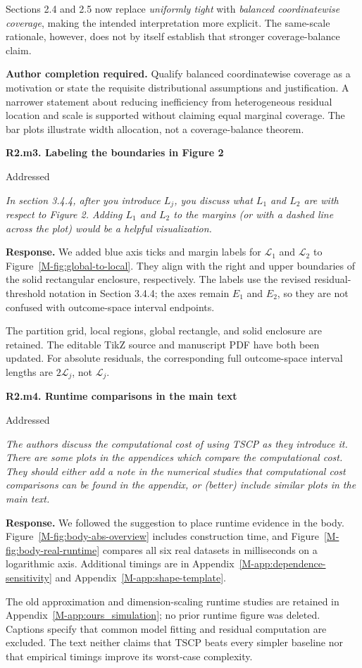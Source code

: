 \documentclass[11pt]{article}
\newcommand{\msapp}[1]{Appendix~\ref*{M-#1}}
\newcommand{\msfig}[1]{Figure~\ref*{M-#1}}
\newcommand{\action}[1]{\par{\small\color{ActionRed}\textbf{Author completion required.} #1\par}}
\newcommand{\point}[3]{\par\Needspace{7\baselineskip}\medskip
\noindent\parbox[t]{0.77\linewidth}{\textbf{#1}}\hfill
\parbox[t]{0.21\linewidth}{\raggedleft\small\sffamily #2}\par\nopagebreak
{\color{ReviewerBlue}\small\itshape #3\par}\textbf{Response.} }
\begin{document}
Sections 2.4 and 2.5 now replace \emph{uniformly tight} with \emph{balanced coordinatewise coverage}, making the intended interpretation more explicit. The same-scale rationale, however, does not by itself establish that stronger coverage-balance claim.

\action{Qualify balanced coordinatewise coverage as a motivation or state the requisite distributional assumptions and justification. A narrower statement about reducing inefficiency from heterogeneous residual location and scale is supported without claiming equal marginal coverage. The bar plots illustrate width allocation, not a coverage-balance theorem.}

\point{R2.m3. Labeling the boundaries in Figure 2}{Addressed}{In section 3.4.4, after you introduce $L_j$, you discuss what
$L_1$ and $L_2$ are with respect to Figure 2. Adding $L_1$ and
$L_2$ to the margins (or with a dashed line across the plot)
would be a helpful visualization.}
\label{response:R2.m3}
We added blue axis ticks and margin labels for $\mathcal L_1$ and $\mathcal L_2$ to \msfig{fig:global-to-local}. They align with the right and upper boundaries of the solid rectangular enclosure, respectively. The labels use the revised residual-threshold notation in Section 3.4.4; the axes remain $E_1$ and $E_2$, so they are not confused with outcome-space interval endpoints.

The partition grid, local regions, global rectangle, and solid enclosure are retained. The editable TikZ source and manuscript PDF have both been updated. For absolute residuals, the corresponding full outcome-space interval lengths are $2\mathcal L_j$, not $\mathcal L_j$.

\point{R2.m4. Runtime comparisons in the main text}{Addressed}{The authors discuss the computational cost of using TSCP as they
introduce it. There are some plots in the appendices which compare
the computational cost. They should either add a note in the
numerical studies that computational cost comparisons can be
found in the appendix, or (better) include similar plots in the
main text.}
\label{response:R2.m4}
We followed the suggestion to place runtime evidence in the body. \msfig{fig:body-abs-overview} includes construction time, and \msfig{fig:body-real-runtime} compares all six real datasets in milliseconds on a logarithmic axis. Additional timings are in \msapp{app:dependence-sensitivity} and \msapp{app:shape-template}.

The old approximation and dimension-scaling runtime studies are retained in \msapp{app:ours_simulation}; no prior runtime figure was deleted. Captions specify that common model fitting and residual computation are excluded. The text neither claims that TSCP beats every simpler baseline nor that empirical timings improve its worst-case complexity.
\end{document}
